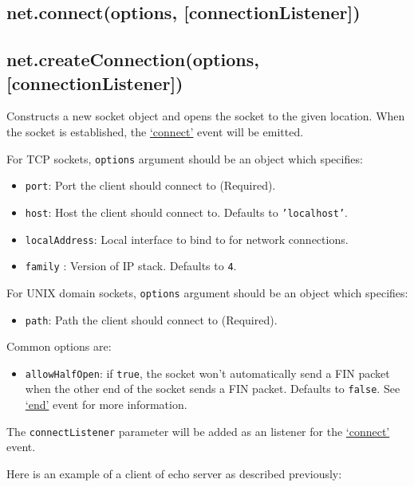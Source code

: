\subsection{net.connect(options, {[}connectionListener{]})}

\subsection{net.createConnection(options, {[}connectionListener{]})}

Constructs a new socket object and opens the socket to the given
location. When the socket is established, the
\hyperref[net\_event\_connect]{`connect'} event will be emitted.

For TCP sockets, \texttt{options} argument should be an object which
specifies:

\begin{itemize}
\item
  \texttt{port}: Port the client should connect to (Required).
\item
  \texttt{host}: Host the client should connect to. Defaults to
  \texttt{'localhost'}.
\item
  \texttt{localAddress}: Local interface to bind to for network
  connections.
\item
  \texttt{family} : Version of IP stack. Defaults to \texttt{4}.
\end{itemize}

For UNIX domain sockets, \texttt{options} argument should be an object
which specifies:

\begin{itemize}
\item
  \texttt{path}: Path the client should connect to (Required).
\end{itemize}

Common options are:

\begin{itemize}
\item
  \texttt{allowHalfOpen}: if \texttt{true}, the socket won't
  automatically send a FIN packet when the other end of the socket sends
  a FIN packet. Defaults to \texttt{false}. See
  \hyperref[net\_event\_end]{`end'} event for more information.
\end{itemize}

The \texttt{connectListener} parameter will be added as an listener for
the \hyperref[net\_event\_connect]{`connect'} event.

Here is an example of a client of echo server as described previously:

